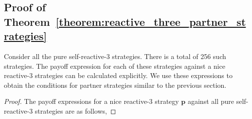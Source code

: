 \documentclass[11pt]{article}
\theoremstyle{plainCl1}
\theoremstyle{plainCl2}
\begin{document}

\subsection{Proof of Theorem~\ref{theorem:reactive_three_partner_strategies}}\label{appendix:reactive_three_pure_self_reactive}

Consider all the pure self-reactive-3 strategies. There is
a total of 256 such strategies. The payoff expression for each of
these strategies against a nice reactive-3 strategies can be calculated
explicitly. We use these expressions to obtain the conditions for partner
strategies similar to the previous section.

\begin{proof}
The payoff expressions for a nice reactive-3 strategy $\mathbf{p}$ against all
pure self-reactive-3 strategies are as follows,


\end{proof}
\end{document}
